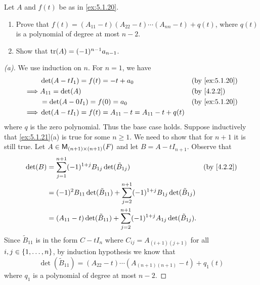 \begin{ex}\label{ex:5.1.21}
  Let \(A\) and \(f(t)\) be as in \cref{ex:5.1.20}.
  \begin{enumerate}
    \item Prove that \(f(t) = (A_{1 1} - t)(A_{2 2} - t) \cdots (A_{n n} - t) + q(t)\), where \(q(t)\) is a polynomial of degree at most \(n - 2\).
    \item Show that \(\tr(A) = (-1)^{n - 1} a_{n - 1}\).
  \end{enumerate}
\end{ex}

\begin{proof}[(a)]
  We use induction on \(n\).
  For \(n = 1\), we have
  \begin{align*}
             & \det(A - t I_1) = f(t) = -t + a_0                         &  & \text{(by \cref{ex:5.1.20})} \\
    \implies & A_{1 1} = \det(A)                                         &  & \text{(by \cref{4.2.2})}     \\
             & = \det(A - 0 I_1) = f(0) = a_0                            &  & \text{(by \cref{ex:5.1.20})} \\
    \implies & \det(A - t I_1) = f(t) = A_{1 1} - t = A_{1 1} - t + q(t)
  \end{align*}
  where \(q\) is the zero polynomial.
  Thus the base case holds.
  Suppose inductively that \cref{ex:5.1.21}(a) is true for some \(n \geq 1\).
  We need to show that for \(n + 1\) it is still true.
  Let \(A \in \mathsf{M}_{{(n + 1)} \times (n + 1)}({\mathit{F}})\) and let \(B = A - t I_{n + 1}\).
  Observe that
  \begin{align*}
    \det(B) & = \sum_{j = 1}^{n + 1} (-1)^{1 + j} B_{1 j} \det(\tilde{B}_{1 j})                                          &  & \text{(by \cref{4.2.2})} \\
            & = (-1)^{2} B_{1 1} \det(\tilde{B}_{1 1}) + \sum_{j = 2}^{n + 1} (-1)^{1 + j} B_{1 j} \det(\tilde{B}_{1 j})                               \\
            & = (A_{1 1} - t) \det(\tilde{B}_{1 1}) + \sum_{j = 2}^{n + 1} (-1)^{1 + j} A_{1 j} \det(\tilde{B}_{1 j}).
  \end{align*}
  Since \(\tilde{B}_{1 1}\) is in the form \(C - t I_n\) where \(C_{i j} = A_{(i + 1) (j + 1)}\) for all \(i, j \in \left\lbrace1, \dots, n\right\rbrace\), by induction hypothesis we know that
  \[
    \det(\tilde{B}_{1 1}) = (A_{2 2} - t) \cdots (A_{(n + 1) (n + 1)} - t) + q_1(t)
  \]
  where \(q_1\) is a polynomial of degree at most \(n - 2\).

\end{proof}
